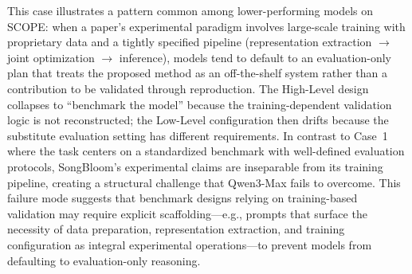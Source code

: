 This case illustrates a pattern common among lower-performing models on \textsc{SCOPE}: when a paper's experimental paradigm involves large-scale training with proprietary data and a tightly specified pipeline (representation extraction $\rightarrow$ joint optimization $\rightarrow$ inference), models tend to default to an evaluation-only plan that treats the proposed method as an off-the-shelf system rather than a contribution to be validated through reproduction. The High-Level design collapses to ``benchmark the model'' because the training-dependent validation logic is not reconstructed; the Low-Level configuration then drifts because the substitute evaluation setting has different requirements. In contrast to Case~1 where the task centers on a standardized benchmark with well-defined evaluation protocols, SongBloom's experimental claims are inseparable from its training pipeline, creating a structural challenge that Qwen3-Max fails to overcome. This failure mode suggests that benchmark designs relying on training-based validation may require explicit scaffolding---e.g., prompts that surface the necessity of data preparation, representation extraction, and training configuration as integral experimental operations---to prevent models from defaulting to evaluation-only reasoning.


